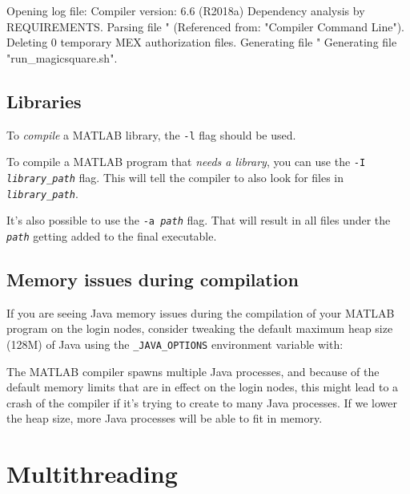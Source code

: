 \begin{prompt}
Opening log file:  %
Compiler version: 6.6 (R2018a)
Dependency analysis by REQUIREMENTS.
Parsing file "%
	(Referenced from: "Compiler Command Line").
Deleting 0 temporary MEX authorization files.
Generating file "%
Generating file "run\_magicsquare.sh".
\end{prompt}

\subsection{Libraries}

To \emph{compile} a MATLAB library, the \verb|-l| flag should be used.

To compile a MATLAB program that \emph{needs a library}, you can use the
\texttt{-I \emph{library\_path}} flag. This will tell the compiler to also
look for files in \texttt{\emph{library\_path}}.

It's also possible to use the \texttt{-a \emph{path}} flag. That will result in
all files under the \texttt{\emph{path}} getting added to the final executable.

\subsection{Memory issues during compilation}

If you are seeing Java memory issues during the compilation of your MATLAB program
on the login nodes, consider tweaking the default maximum heap size (128M) of Java
using the \verb|_JAVA_OPTIONS| environment variable with:

\begin{prompt}
\end{prompt}

The MATLAB compiler spawns multiple Java processes, and because of the default memory
limits that are in effect on the login nodes, this might lead to a crash of the compiler
if it's trying to create to many Java processes. If we lower the heap size, more
Java processes will be able to fit in memory.

\section{Multithreading}


